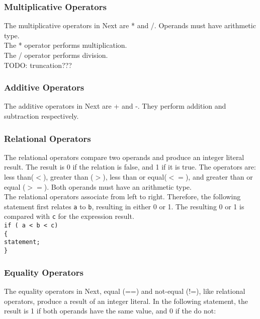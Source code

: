 \documentclass[12pt]{article}
\begin{document}
\subsubsection{Multiplicative Operators}
The multiplicative operators in Next are * and /.  Operands must have arithmetic type. \\

\noindent The * operator performs multiplication. \\

\noindent The / operator performs division.  \\
TODO: truncation???

\subsubsection{Additive Operators}
The additive operators in Next are + and -.  They perform addition and subtraction respectively.

\subsubsection{Relational Operators}
The relational operators compare two operands and produce an integer literal result.  The result is 0 if the relation is false, and 1 if it is true.  The operators are: less than($<$), greater than ($>$), less than or equal($<=$), and greater than or equal ($>=$).  Both operands must have an arithmetic type. \\

\noindent The relational operators associate from left to right.  Therefore, the following statement first relates \texttt{a} to \texttt{b}, resulting in either 0 or 1.  The resulting 0 or 1 is compared with \texttt{c} for the expression result. \\

\texttt{if ( a < b < c) \\
\indent \{ \\
\indent \indent statement; \\
\indent \} }

\subsubsection{Equality Operators}
The equality operators in Next, equal (==) and not-equal (!=), like relational operators, produce a result of an integer literal.  In the following statement, the result is 1 if both operands have the same value, and 0 if the do not: \\
\end{document}
